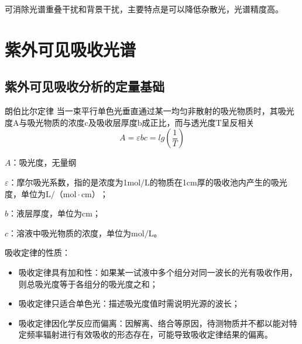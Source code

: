 \begin{itemize}
\begin{itemize}
        可消除光谱重叠干扰和背景干扰，主要特点是可以降低杂散光，光谱精度高。
    \end{itemize}
\end{itemize}
\section{紫外可见吸收光谱}
\subsection{紫外可见吸收分析的定量基础}
\begin{theorem*}{朗伯比尔定律}
    当一束平行单色光垂直通过某一均匀非散射的吸光物质时，其吸光度$\mathrm{A}$与吸光物质的浓度$\mathrm{c}$及吸收层厚度$\mathrm{b}$成正比，而与透光度T呈反相关
    \begin{equation*}
        A=\varepsilon bc =lg(\frac{1}{T})
    \end{equation*}
\end{theorem*}
\begin{note}
$A$：吸光度，无量纲

$\varepsilon$：摩尔吸光系数，指的是浓度为1$ \mathrm{mol/L}$的物质在1$\mathrm{cm}$厚的吸收池内产生的吸光度，单位为$\mathrm{L/（mol\cdot cm）}$；

$b$：液层厚度，单位为$\mathrm{cm}$；

$c$：溶液中吸光物质的浓度，单位为$\mathrm{mol/L}$。
\end{note}

吸收定律的性质：
\begin{itemize}
    \item 吸收定律具有加和性：如果某一试液中多个组分对同一波长的光有吸收作用，则总吸光度等于各组分的吸光度之和；
    \item 吸收定律只适合单色光：描述吸光度值时需说明光源的波长；
    \item 吸收定律因化学反应而偏离：因解离、络合等原因，待测物质并不都以能对特定频率辐射进行有效吸收的形态存在，可能导致吸收定律结果的偏离。
\end{itemize}

